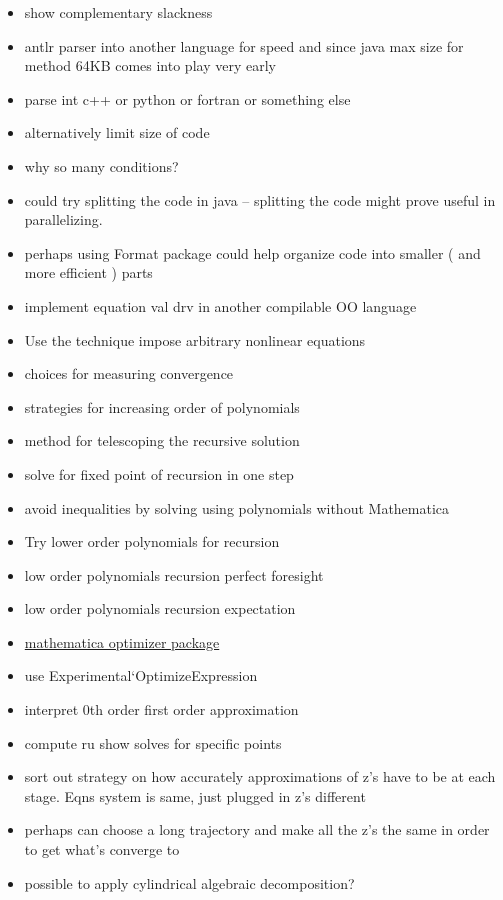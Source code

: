 \documentclass[12pt]{article}
\begin{document}
\begin{itemize}
\item show complementary slackness
\item antlr parser into another language for speed and since java max size for method 64KB comes into play very early
\item parse int c++ or python or fortran or something else
\item alternatively limit size of code
\item why so many conditions?
\item could try splitting the code in java  -- splitting the code might prove useful in parallelizing.
\item perhaps using Format  package could help organize code into
smaller ( and more efficient ) parts
\item implement equation val drv in another compilable OO language
\item Use the technique impose arbitrary nonlinear equations
\item choices for measuring convergence
\item strategies for increasing order of polynomials
\item method for telescoping the recursive solution
\item solve for fixed point of recursion in one step
\item avoid inequalities by solving using polynomials without Mathematica
\item Try lower order polynomials for recursion
\item low order polynomials recursion perfect foresight
\item low order polynomials recursion expectation
\item \href{http://library.wolfram.com/infocenter/Conferences/5398/MOandMOPTalk.pdf}{mathematica optimizer  package}
\item use Experimental`OptimizeExpression
\item interpret 0th order first order approximation
\item compute ru show solves for specific points
\item sort out strategy on how accurately approximations of z's have to be at each stage.  Eqns system is same, just plugged in z's different
\item perhaps can choose a long trajectory and make all the z's the same in order to get what's converge to
\item possible to apply cylindrical algebraic decomposition?

\end{itemize}
\end{document}
